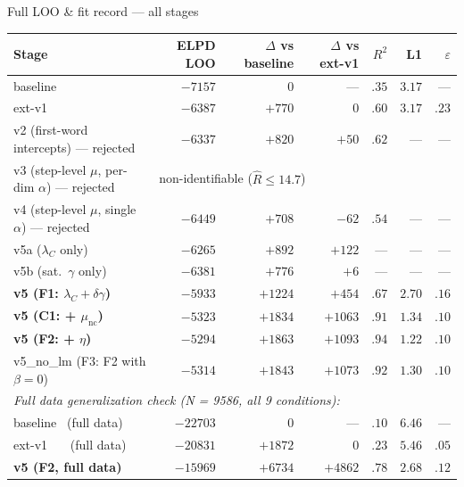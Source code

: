 \documentclass[10pt,aspectratio=169]{beamer}
\newcommand{\main}[1]{\textcolor{CSP-main-dark}{\textbf{#1}}}
\newcommand{\emp}[1]{\textcolor{CSP-emphasis}{\textbf{#1}}}
\newcommand{\acct}[1]{\textcolor{CSP-accent-1-dark}{#1}}      %
\newcommand{\muted}[1]{\textcolor{CSP-text-light}{#1}}
\begin{document}
\begin{frame}{Full LOO \& fit record --- all stages}
\footnotesize
\begin{center}
\begin{tabular}{l rrrr rr}
\toprule
Stage & ELPD LOO & $\Delta$ vs baseline & $\Delta$ vs ext-v1 & $R^2$ & L1 & $\varepsilon$ \\
\midrule
baseline        & $-7157$ & $0$       & ---       & $.35$ & $3.17$ & ---   \\
ext-v1          & $-6387$ & $+770$    & $0$       & $.60$ & $3.17$ & $.23$  \\
\muted{v2 (first-word intercepts) --- rejected}  & $-6337$ & $+820$  & $+50$   & $.62$ & ---     & ---   \\
\muted{v3 (step-level $\mu$, per-dim $\alpha$) --- rejected} & \multicolumn{6}{l}{non-identifiable ($\hat R \leq 14.7$)} \\
\muted{v4 (step-level $\mu$, single $\alpha$) --- rejected} & $-6449$ & $+708$  & $-62$   & $.54$ & ---     & ---   \\
\acct{v5a ($\lambda_C$ only)}         & $-6265$ & $+892$  & $+122$   & ---   & ---     & ---   \\
\acct{v5b (sat.\ $\gamma$ only)}      & $-6381$ & $+776$  & $+6$     & ---   & ---     & ---   \\
\main{v5 (F1: $\lambda_C + \delta\gamma$)}   & $-5933$ & $+1224$ & $+454$   & $.67$ & $2.70$  & $.16$ \\
\main{v5 (C1: + $\mu_\mathrm{nc}$)}          & $-5323$ & $+1834$ & $+1063$  & $.91$ & $1.34$  & $.10$ \\
\emp{v5 (F2: + $\eta$)}                      & $-5294$ & $+1863$ & $+1093$  & $.94$ & $1.22$  & $.10$ \\
\muted{v5\_no\_lm (F3: F2 with $\beta=0$)}     & $-5314$ & $+1843$ & $+1073$  & $.92$ & $1.30$  & $.10$ \\
\midrule
\multicolumn{7}{l}{\textit{Full data generalization check (N = 9586, all 9 conditions):}} \\
\muted{baseline \ (full data)}              & $-22703$ & $0$      & ---      & $.10$ & $6.46$  & ---   \\
\muted{ext-v1 \ \ \ (full data)}            & $-20831$ & $+1872$  & $0$      & $.23$ & $5.46$  & $.05$ \\
\main{v5 (F2, full data)}                   & $-15969$ & $+6734$  & $+4862$  & $.78$ & $2.68$  & $.12$ \\
\bottomrule
\end{tabular}
\end{center}


\end{frame}
\end{document}

